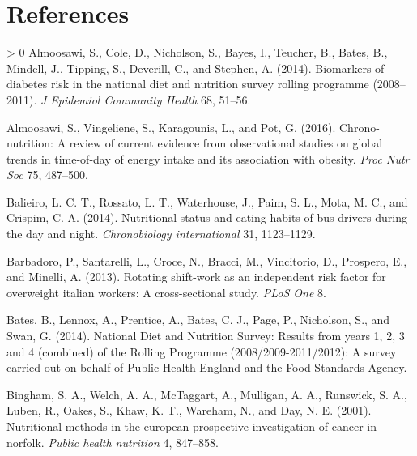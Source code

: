 \documentclass[utf8]{frontiersSCNS}
\newlength{\cslhangindent}
\newenvironment{CSLReferences}[3] %
 {%
  \setlength{\parindent}{0pt}
  \ifodd #1 \everypar{\setlength{\hangindent}{\cslhangindent}}\ignorespaces\fi
  \ifnum #2 > 0
  \setlength{\parskip}{#2\baselineskip}
  \fi
 }%
 {}
\begin{document}
\newpage

\hypertarget{references}{%
\section*{References}\label{references}}

\hypertarget{refs}{}
\begin{CSLReferences}{1}{0}
\leavevmode\hypertarget{ref-almoosawi2014biomarkers}{}%
Almoosawi, S., Cole, D., Nicholson, S., Bayes, I., Teucher, B., Bates,
B., Mindell, J., Tipping, S., Deverill, C., and Stephen, A. (2014).
Biomarkers of diabetes risk in the national diet and nutrition survey
rolling programme (2008--2011). \emph{J Epidemiol Community Health} 68,
51--56.

\leavevmode\hypertarget{ref-almoosawi2016chrono}{}%
Almoosawi, S., Vingeliene, S., Karagounis, L., and Pot, G. (2016).
Chrono-nutrition: A review of current evidence from observational
studies on global trends in time-of-day of energy intake and its
association with obesity. \emph{Proc Nutr Soc} 75, 487--500.

\leavevmode\hypertarget{ref-balieiro2014nutritional}{}%
Balieiro, L. C. T., Rossato, L. T., Waterhouse, J., Paim, S. L., Mota,
M. C., and Crispim, C. A. (2014). Nutritional status and eating habits
of bus drivers during the day and night. \emph{Chronobiology
international} 31, 1123--1129.

\leavevmode\hypertarget{ref-barbadoro2013rotating}{}%
Barbadoro, P., Santarelli, L., Croce, N., Bracci, M., Vincitorio, D.,
Prospero, E., and Minelli, A. (2013). Rotating shift-work as an
independent risk factor for overweight italian workers: A
cross-sectional study. \emph{PLoS One} 8.

\leavevmode\hypertarget{ref-bates2014national}{}%
Bates, B., Lennox, A., Prentice, A., Bates, C. J., Page, P., Nicholson,
S., and Swan, G. (2014). National {D}iet and {N}utrition {S}urvey:
Results from years 1, 2, 3 and 4 (combined) of the {R}olling {P}rogramme
(2008/2009-2011/2012): A survey carried out on behalf of {P}ublic
{H}ealth {E}ngland and the {F}ood {S}tandards {A}gency.

\leavevmode\hypertarget{ref-bingham2001nutritional}{}%
Bingham, S. A., Welch, A. A., McTaggart, A., Mulligan, A. A., Runswick,
S. A., Luben, R., Oakes, S., Khaw, K. T., Wareham, N., and Day, N. E.
(2001). Nutritional methods in the european prospective investigation of
cancer in norfolk. \emph{Public health nutrition} 4, 847--858.


\end{CSLReferences}
\end{document}

